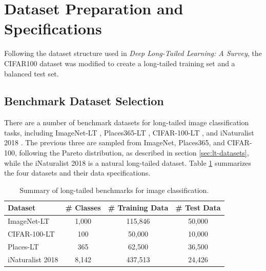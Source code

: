 \section{Dataset Preparation and Specifications}
\label{sec:dataset_specs}
Following the dataset structure used in \textit{Deep Long-Tailed Learning: A Survey}, the CIFAR100 dataset was modified to create a long-tailed training set and a balanced test set. 

\subsection{Benchmark Dataset Selection}
There are a number of benchmark datasets for long-tailed image classification tasks, including ImageNet-LT \cite{liu2019largescalelongtailedrecognitionopen}, Places365-LT \cite{liu2019largescalelongtailedrecognitionopen}, CIFAR-100-LT \cite{cao2019learningimbalanceddatasetslabeldistributionaware}, and iNaturalist 2018 \cite{vanhorn2018inaturalistspeciesclassificationdetection}. The previous three are sampled from ImageNet, Places365, and CIFAR-100, following the Pareto distribution, as described in section \ref{sec:lt-datasets}, while the iNaturalist 2018 is a natural long-tailed dataset. Table \ref{tab:datasets} summarizes the four datasets and their data specifications. 

\begin{table}[ht]
    \centering
    \caption{Summary of long-tailed benchmarks for image classification.}
    \begin{tabular}{lccc}
    \hline
    \textbf{Dataset}           & \textbf{\# Classes} & \textbf{\# Training Data} & \textbf{\# Test Data} \\ \hline
    ImageNet-LT \cite{liu2019largescalelongtailedrecognitionopen}  & 1,000              & 115,846                   & 50,000                \\
    CIFAR-100-LT \cite{cao2019learningimbalanceddatasetslabeldistributionaware}  & 100                & 50,000                    & 10,000                \\
    Places-LT  \cite{liu2019largescalelongtailedrecognitionopen}   & 365                & 62,500                    & 36,500                \\
    iNaturalist 2018 \cite{vanhorn2018inaturalistspeciesclassificationdetection} & 8,142            & 437,513                   & 24,426                \\ \hline
    \end{tabular}
    \label{tab:datasets}
\end{table}
    

